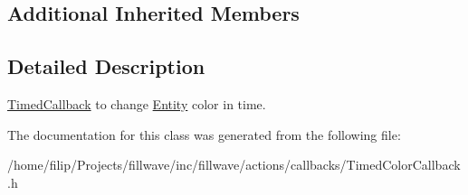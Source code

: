 \subsection*{Additional Inherited Members}


\subsection{Detailed Description}
\hyperlink{classflw_1_1flf_1_1TimedCallback}{Timed\+Callback} to change \hyperlink{classflw_1_1flf_1_1Entity}{Entity} color in time. 

The documentation for this class was generated from the following file\+:\begin{DoxyCompactItemize}
\item 
/home/filip/\+Projects/fillwave/inc/fillwave/actions/callbacks/Timed\+Color\+Callback.\+h\end{DoxyCompactItemize}
